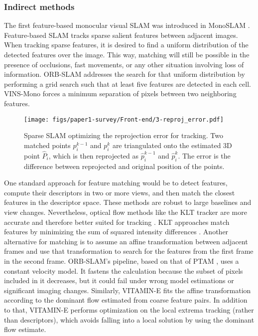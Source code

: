 \subsubsection{Indirect methods}
\label{sec:frontend:indirectmethods}
The first feature-based monocular visual SLAM was introduced in MonoSLAM \cite{davison2007monoslam}. Feature-based SLAM tracks sparse salient features between adjacent images.
When tracking sparse features, it is desired to find a uniform distribution of the detected features over the image. This way, matching will still be possible in the presence of occlusions, fast movements, or any other situation involving loss of information.
ORB-SLAM \cite{mur2015orb} addresses the search for that uniform distribution by performing a grid search such that at least five features are detected in each cell. VINS-Mono \cite{qin2018vins-mono} forces a minimum separation of pixels between two neighboring features.

\begin{figure}[tpb]

    \centering
    \smallskip
    \texttt{[image: figs/paper1-survey/Front-end/3-reproj\_error.pdf]}

    \caption[Diagram showcasing how sparse SLAM optimizes the projection error for tracking]{Sparse SLAM optimizing the reprojection error for tracking. Two matched points $p^{k-1}_i$ and $p^{k}_i$ are triangulated onto the estimated 3D point $\hat{P}_i$, which is then reprojected as $\hat{p}^{k-1}_i$ and $\hat{p}^{k}_i$. The error is the difference between reprojected and original position of the points.}
    \label{fig:reprojection}
\end{figure}

One standard approach for feature matching would be to detect features, compute their descriptors in two or more views, and then match the closest features in the descriptor space.
These methods are robust to large baselines and view changes. Nevertheless, optical flow methods like the \ac{KLT} tracker are more accurate and therefore better suited for tracking \cite{qin2018vins-mono}. \ac{KLT} approaches match features by minimizing the sum of squared intensity differences \cite{lucas1981klt1}\cite{tomasi1991klt2}.
Another alternative for matching is to assume an affine transformation between adjacent frames and use that transformation to search for the features from the first frame in the second frame. ORB-SLAM's \cite{mur2015orb} pipeline, based on that of \ac{PTAM}  \cite{klein2007ptam}, uses a constant velocity model. It fastens the calculation because the subset of pixels included in it decreases, but it could fail under wrong model estimations or significant imaging changes.
Similarly, VITAMIN-E \cite{Yokozuka_2019vitamine} fits the affine transformation according to the dominant flow estimated from coarse feature pairs. In addition to that, VITAMIN-E performs optimization on the local extrema tracking (rather than descriptors), which avoids falling into a local solution by using the dominant flow estimate.

